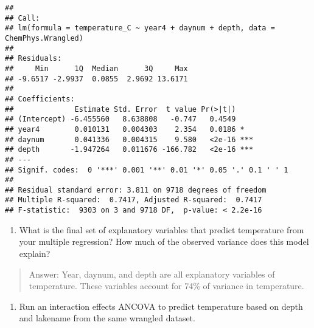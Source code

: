 \documentclass[]{article}
\newenvironment{Shaded}{\begin{snugshade}}{\end{snugshade}}
\newcommand{\CommentTok}[1]{\textcolor[rgb]{0.56,0.35,0.01}{\textit{#1}}}
\newcommand{\DataTypeTok}[1]{\textcolor[rgb]{0.13,0.29,0.53}{#1}}
\newcommand{\KeywordTok}[1]{\textcolor[rgb]{0.13,0.29,0.53}{\textbf{#1}}}
\newcommand{\NormalTok}[1]{#1}
\newcommand{\OperatorTok}[1]{\textcolor[rgb]{0.81,0.36,0.00}{\textbf{#1}}}
\newcommand{\StringTok}[1]{\textcolor[rgb]{0.31,0.60,0.02}{#1}}
\providecommand{\tightlist}{%
  \setlength{\itemsep}{0pt}\setlength{\parskip}{0pt}}
\begin{document}
\begin{verbatim}
## 
## Call:
## lm(formula = temperature_C ~ year4 + daynum + depth, data = ChemPhys.Wrangled)
## 
## Residuals:
##     Min      1Q  Median      3Q     Max 
## -9.6517 -2.9937  0.0855  2.9692 13.6171 
## 
## Coefficients:
##              Estimate Std. Error  t value Pr(>|t|)    
## (Intercept) -6.455560   8.638808   -0.747   0.4549    
## year4        0.010131   0.004303    2.354   0.0186 *  
## daynum       0.041336   0.004315    9.580   <2e-16 ***
## depth       -1.947264   0.011676 -166.782   <2e-16 ***
## ---
## Signif. codes:  0 '***' 0.001 '**' 0.01 '*' 0.05 '.' 0.1 ' ' 1
## 
## Residual standard error: 3.811 on 9718 degrees of freedom
## Multiple R-squared:  0.7417, Adjusted R-squared:  0.7417 
## F-statistic:  9303 on 3 and 9718 DF,  p-value: < 2.2e-16
\end{verbatim}

\begin{enumerate}
\def\labelenumi{\arabic{enumi}.}
\setcounter{enumi}{4}
\tightlist
\item
  What is the final set of explanatory variables that predict
  temperature from your multiple regression? How much of the observed
  variance does this model explain?
\end{enumerate}

\begin{quote}
Answer: Year, daynum, and depth are all explanatory variables of
temperature. These variables account for 74\% of variance in
temperature.
\end{quote}

\begin{enumerate}
\def\labelenumi{\arabic{enumi}.}
\setcounter{enumi}{5}
\tightlist
\item
  Run an interaction effects ANCOVA to predict temperature based on
  depth and lakename from the same wrangled dataset.
\end{enumerate}

\begin{Shaded}
\end{Shaded}
\end{document}
